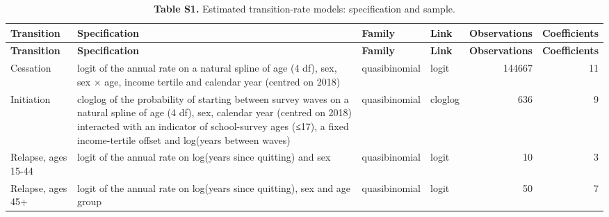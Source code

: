 \scriptsize
\setlength{\tabcolsep}{3pt}
\begin{longtable}{p{2.3cm}p{6.6cm}p{1.6cm}p{1.1cm}rr}
\caption{\textbf{Table S1.} Estimated transition-rate models: specification and sample.}\\
\toprule
\textbf{Transition} & \textbf{Specification} & \textbf{Family} & \textbf{Link} & \textbf{Observations} & \textbf{Coefficients} \\
\midrule
\endfirsthead
\toprule
\textbf{Transition} & \textbf{Specification} & \textbf{Family} & \textbf{Link} & \textbf{Observations} & \textbf{Coefficients} \\
\midrule
\endhead
\bottomrule
\endfoot
Cessation & logit of the annual rate on a natural spline of age (4 df), sex, sex × age, income tertile and calendar year (centred on 2018) & quasibinomial & logit & 144667 & 11 \\
Initiation & cloglog of the probability of starting between survey waves on a natural spline of age (4 df), sex, calendar year (centred on 2018) interacted with an indicator of school-survey ages (≤17), a fixed income-tertile offset and log(years between waves) & quasibinomial & cloglog & 636 & 9 \\
Relapse, ages 15-44 & logit of the annual rate on log(years since quitting) and sex & quasibinomial & logit & 10 & 3 \\
Relapse, ages 45+ & logit of the annual rate on log(years since quitting), sex and age group & quasibinomial & logit & 50 & 7 \\
\end{longtable}
\normalsize
